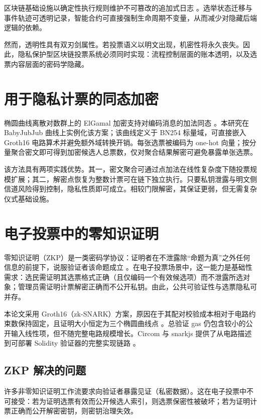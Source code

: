区块链基础设施以确定性执行规则维护不可篡改的追加式日志 \cite{nakamoto2008,wood2014}。选举状态迁移与事件轨迹可透明记录，智能合约可直接强制生命周期不变量，从而减少对隐藏后端逻辑的依赖。

然而，透明性具有双刃剑属性。若投票语义以明文出现，机密性将永久丧失。因此，隐私保护型区块链投票系统必须同时实现：流程控制层面的账本透明，以及选票内容层面的密码学隐藏。

\section{用于隐私计票的同态加密}

椭圆曲线离散对数群上的 ElGamal 加密支持对编码消息的加法同态 \cite{elgamal1985,hankerson2004ecc}。本研究在 BabyJubJub 曲线上实例化该方案；该曲线定义于 BN254 标量域，可直接嵌入 Groth16 电路算术并避免额外域转换开销。每张选票被编码为 one-hot 向量；按分量聚合密文即可得到加密候选人总票数，仅对聚合结果解密可避免暴露单张选票。

该方法具有两项实践优势。其一，密文聚合可通过点加法在线性复杂度下随投票规模扩展；其二，解密点恢复为整数计票可在链下独立执行。只要私钥泄露与明文侧信道风险得到控制，隐私性质即可成立。相较门限解密，其保证更弱，但无需复杂仪式基础设施。

\section{电子投票中的零知识证明}

零知识证明（ZKP）是一类密码学协议：证明者在不泄露除“命题为真”之外任何信息的前提下，说服验证者该命题成立 \cite{goldwasser1989}。在电子投票场景中，这一能力是基础性需求：选民需证明其选票格式正确（且仅编码一个有效候选项）而不泄露所选对象；管理员需证明计票解密正确而不公开私钥。由此，公共可验证性与选票隐私可并存。

本论文采用 Groth16（zk-SNARK）方案，原因在于其配对校验成本相对于电路约束数保持固定，且证明大小恒定为三个椭圆曲线点 \cite{groth2016}。总验证 gas 仍包含较小的公开输入线性项，但不随完整电路规模增长。Circom 与 snarkjs 提供了从电路描述到可部署 Solidity 验证器的完整实现链路 \cite{circomdocs,snarkjs}。

\subsection{ZKP 解决的问题}

许多非零知识证明工作流要求向验证者暴露见证（私密数据）。这在电子投票中不可接受：若为证明选票有效而公开候选人索引，则选票保密性被破坏；若为证明计票正确而公开解密密钥，则密钥治理失效。

